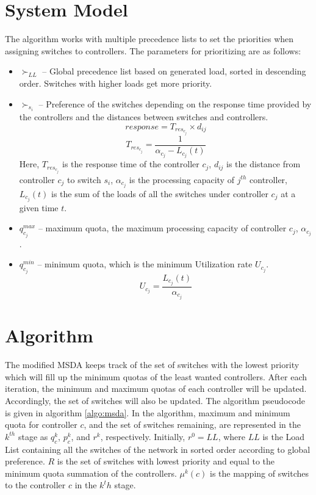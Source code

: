 \documentclass{article}
\begin{document}
	\section{System Model} \label{sysMod}
	The algorithm works with multiple precedence lists to set the priorities when assigning switches to controllers. The parameters for prioritizing are as follows:
	\begin{itemize}
		\item $\succ_{LL}$ -- Global precedence list based on generated load, sorted in descending order. Switches with higher loads get more priority.
		
		\item $\succ_{s_i}$ -- Preference of the switches depending on the response time provided by the controllers and the distances between switches and controllers.
		\begin{equation}
		response = T_{res_{c_j}} \times d_{ij}
		\end{equation}
		\begin{equation}
		T_{res_{c_j}}=\frac{1}{\alpha_{c_j}-L_{c_j}(t)}
		\end{equation}
		Here, $T_{res_{c_j}}$ is the response time of the controller $c_j$, $d_{ij}$ is the distance from controller $c_j$ to switch $s_i$, $\alpha_{c_j}$ is the processing capacity of $j^{th}$ controller, $L_{c_j}(t)$ is the sum of the loads of all the switches under controller $c_j$ at a given time $t$.
		
		\item $q_{c_j}^{max}$ -- maximum quota, the maximum processing capacity of controller $c_j$, $\alpha_{c_j}$.
		
		\item $q_{c_j}^{min}$ -- minimum quota, which is the minimum Utilization rate $U_{c_j}$.
		\begin{equation}
		U_{c_j}=\frac{L_{c_j}(t)}{\alpha_{c_j}}
		\end{equation}
	\end{itemize}
	
	\section{Algorithm}
	The modified MSDA keeps track of the set of switches with the lowest priority which will fill up the  minimum quotas of the least wanted controllers. After each iteration, the minimum and maximum quotas of each controller will be updated. Accordingly, the set of switches will also be updated. The algorithm pseudocode is given in algorithm \ref{algo:msda}. In the algorithm, maximum and minimum quota for controller $c$, and the set of switches remaining, are represented in the $k^{th}$ stage as $q_c^k$, $p_c^k$, and $r^k$, respectively. Initially, $r^0=LL$, where $LL$ is the Load List containing all the switches of the network in sorted order according to global preference. $R$ is the set of switches with lowest priority and equal to the minimum quota summation of the controllers. $\mu^k(c)$ is the mapping of switches to the controller $c$ in the $k^th$ stage.
	
\end{document}
